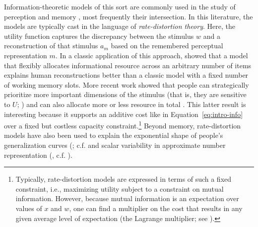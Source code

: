 Information-theoretic models of this sort are commonly used in the study of perception \citep{sims2016rate} and memory \citep{gershman2021rational}, most frequently their intersection. In this literature, the models are typically cast in the language of \emph{rate-distortion theory}. Here, the utility function captures the discrepancy between the stimulus $w$ and a reconstruction of that stimulus $a_m$ based on the remembered perceptual representation $m$. In a classic application of this approach, \citet{sims2012ideal} showed that a model that flexibly allocates informational resource across an arbitrary number of items explains human reconstructions better than a classic model with a fixed number of working memory slots. More recent work showed that people can strategically prioritize more important dimensions of the stimulus (that is, they are sensitive to $U$; \citealp{yoo2018strategic}) and can also allocate more or less resource in total \citep{berg2018resourcerational}. This latter result is interesting because it supports an additive cost like in Equation~\ref{eq:intro-info} over a fixed but costless capacity constraint.\footnote{
  Typically, rate-distortion models are expressed in terms of such a fixed constraint, i.e., maximizing utility subject to a constraint on mutual information. However, because mutual information is an expectation over values of $x$ and $w$, one can find a multiplier on the cost that results in any given average level of expectation (the Lagrange multiplier; see \citealp{ortega2013thermodynamics}).
} Beyond memory, rate-distortion models have also been used to explain the exponential shape of people's generalization curves (\citealp{sims2018efficient}; c.f. \citealp{shepard1987universal} and scalar variability in approximate number representation (\citealp{piantadosi2016rational}, c.f. \citealp{fechner1860elemente}).


